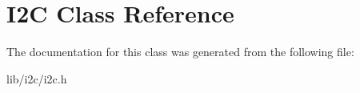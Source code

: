 \hypertarget{class_i2_c}{\section{I2\-C Class Reference}
\label{class_i2_c}
}


The documentation for this class was generated from the following file\-:\begin{DoxyCompactItemize}
\item 
lib/i2c/i2c.\-h\end{DoxyCompactItemize}
